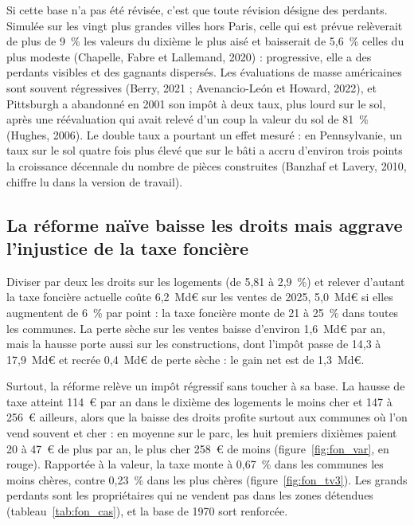 
Si cette base n'a pas été révisée, c'est que toute révision désigne des perdants. Simulée sur les vingt plus grandes
villes hors Paris, celle qui est prévue relèverait de plus de 9~\% les valeurs du dixième le plus aisé et baisserait de
5,6~\% celles du plus modeste (Chapelle, Fabre et Lallemand, 2020) : progressive, elle a des perdants visibles et des
gagnants dispersés. Les évaluations de masse américaines sont souvent régressives (Berry, 2021 ; Avenancio-León et Howard, 2022), et Pittsburgh a abandonné en 2001 son impôt à deux
taux, plus lourd sur le sol, après une réévaluation qui avait relevé d'un coup la valeur du sol de 81~\% (Hughes, 2006).
Le double taux a pourtant un effet mesuré : en Pennsylvanie, un taux sur le sol quatre fois plus élevé que sur le bâti a
accru d'environ trois points la croissance décennale du nombre de pièces construites (Banzhaf et Lavery, 2010, chiffre
lu dans la version de travail).

\subsection{La réforme naïve baisse les droits mais aggrave l'injustice de la taxe foncière}

Diviser par deux les droits sur les logements (de 5,81 à 2,9~\%) et relever d'autant la taxe foncière actuelle coûte
6,2~Md€ sur les ventes de 2025, 5,0~Md€ si elles augmentent de 6~\% par point : la taxe foncière monte de 21 à 25~\% dans
toutes les communes. La perte sèche sur les ventes baisse d'environ 1,6~Md€ par an, mais la hausse porte aussi sur les
constructions, dont l'impôt passe de 14,3 à 17,9~Md€ et recrée 0,4~Md€ de perte sèche : le gain net est de 1,3~Md€.

Surtout, la réforme relève un impôt régressif sans toucher à sa base. La hausse de taxe atteint 114~€ par an dans le
dixième des logements le moins cher et 147 à 256~€ ailleurs, alors que la baisse des droits profite surtout aux communes
où l'on vend souvent et cher : en moyenne sur le parc, les huit premiers dixièmes paient 20 à 47~€ de plus par an, le
plus cher 258~€ de moins (figure~\ref{fig:fon_var}, en rouge). Rapportée à la valeur, la taxe monte à 0,67~\% dans les
communes les moins chères, contre 0,23~\% dans les plus chères (figure~\ref{fig:fon_tv3}). Les grands perdants sont les
propriétaires qui ne vendent pas dans les zones détendues (tableau~\ref{tab:fon_cas}), et la base de 1970 sort renforcée.

